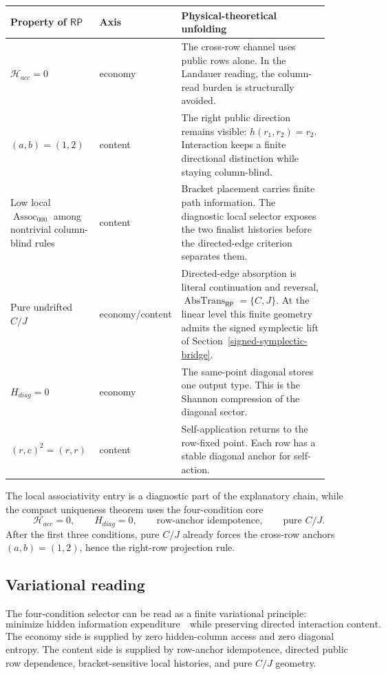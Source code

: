 \documentclass[11pt]{article}
\theoremstyle{definition}
\newcommand{\RP}{\mathsf{RP}}
\begin{document}
\begin{longtable}{@{}p{0.29\linewidth}p{0.16\linewidth}p{0.47\linewidth}@{}}
\toprule
Property of \(\RP\) & Axis & Physical-theoretical unfolding \\
\midrule
\endhead
\bottomrule
\endlastfoot
\(\mathcal H_{acc}=0\) & economy & The cross-row channel uses public rows alone.  In the Landauer reading, the column-read burden is structurally avoided. \\
\((a,b)=(1,2)\) & content & The right public direction remains visible: \(h(r_1,r_2)=r_2\).  Interaction keeps a finite directional distinction while staying column-blind. \\
Low local \(\operatorname{Assoc}_{000}\) among nontrivial column-blind rules & content & Bracket placement carries finite path information.  The diagnostic local selector exposes the two finalist histories before the directed-edge criterion separates them. \\
Pure undrifted \(C/J\) & economy/content & Directed-edge absorption is literal continuation and reversal, \(\operatorname{AbsTrans}_{\RP}=\{C,J\}\).  At the linear level this finite geometry admits the signed symplectic lift of Section~\ref{signed-symplectic-bridge}. \\
\(H_{diag}=0\) & economy & The same-point diagonal stores one output type.  This is the Shannon compression of the diagonal sector. \\
\((r,c)^2=(r,r)\) & content & Self-application returns to the row-fixed point.  Each row has a stable diagonal anchor for self-action. \\
\end{longtable}

The local associativity entry is a diagnostic part of the explanatory chain,
while the compact uniqueness theorem uses the four-condition core
\[
\mathcal H_{acc}=0,
\qquad
H_{diag}=0,
\qquad
\text{row-anchor idempotence},
\qquad
\text{pure }C/J.
\]
After the first three conditions, pure \(C/J\) already forces the cross-row
anchors \((a,b)=(1,2)\), hence the right-row projection rule.

\subsection{Variational reading}\label{variational-reading}

The four-condition selector can be read as a finite variational principle:
\[
\boxed{
\text{minimize hidden information expenditure}
\quad\text{while preserving directed interaction content}.
}
\]
The economy side is supplied by zero hidden-column access and zero diagonal
entropy.  The content side is supplied by row-anchor idempotence, directed public
row dependence, bracket-sensitive local histories, and pure \(C/J\) geometry.
\end{document}

